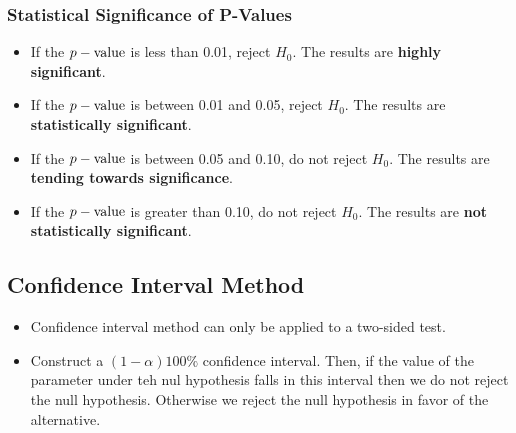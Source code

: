 \documentclass[12pt, letterpaper]{article}
\begin{document}
            \subsubsection{Statistical Significance of P-Values}
                \begin{itemize}
                    \item If the $p-\textnormal{value}$ is less than 0.01, reject $H_0$. The results are \textbf{highly significant}.
                    \item If the $p-\textnormal{value}$ is between 0.01 and 0.05, reject $H_0$. The results are \textbf{statistically significant}.
                    \item If the $p-\textnormal{value}$ is between 0.05 and 0.10, do not reject $H_0$. The results are \textbf{tending towards significance}.
                    \item If the $p-\textnormal{value}$ is greater than 0.10, do not reject $H_0$. The results are \textbf{not statistically significant}.
                \end{itemize}
        \subsection{Confidence Interval Method}
            \begin{itemize}
                \item Confidence interval method can only be applied to a two-sided test.
                \item Construct a $(1-\alpha)100\%$ confidence interval. Then, if the value of the parameter under teh nul hypothesis falls in this interval then we do not reject the null hypothesis. Otherwise we reject the null hypothesis in favor of the alternative.
            \end{itemize}
\end{document}
